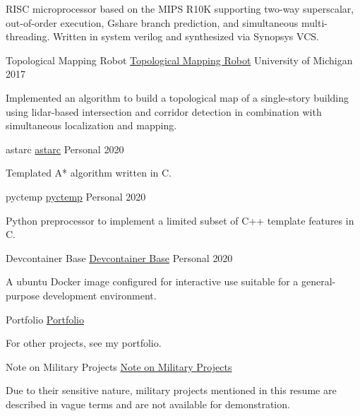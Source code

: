 \documentclass[11pt, a4paper]{cv}
\newenvironment{projects}{}{\par}
\newenvironment{cv}{}{\par}
\begin{document}
\begin{cv}
\begin{projects}
\begin{cventries}
{\begin{cvparagraph}
RISC microprocessor based on the MIPS R10K supporting two-way superscalar, out-of-order execution, Gshare branch prediction, and simultaneous multi-threading. Written in system verilog and synthesized via Synopsys VCS.
\end{cvparagraph}}
\cventrycompact
{
{Topological Mapping Robot}
{\color{hrefblue}\href{https://drive.google.com/drive/folders/1HPq7hU05i7k-j3WwfQ18W5DzQ3FlkSZ9}{Topological Mapping Robot}}}
{}
{University of Michigan}
{2017}
{\begin{cvparagraph}
Implemented an algorithm to build a topological map of a single-story building using lidar-based intersection and corridor detection in combination with simultaneous localization and mapping.
\end{cvparagraph}}
\cventrycompact
{
{astarc}
{\color{hrefblue}\href{https://github.com/brandonmosher/astarc}{astarc}}}
{}
{Personal}
{2020}
{\begin{cvparagraph}
Templated A* algorithm written in C.
\end{cvparagraph}}
\cventrycompact
{
{pyctemp}
{\color{hrefblue}\href{https://github.com/brandonmosher/pyctemp}{pyctemp}}}
{}
{Personal}
{2020}
{\begin{cvparagraph}
Python preprocessor to implement a limited subset of C++ template features in C.
\end{cvparagraph}}
\cventrycompact
{
{Devcontainer Base}
{\color{hrefblue}\href{https://github.com/brandonmosher/devcontainer-base}{Devcontainer Base}}}
{}
{Personal}
{2020}
{\begin{cvparagraph}
A ubuntu Docker image configured for interactive use suitable for a general-purpose development environment.
\end{cvparagraph}}
\cventrycompact
{
{Portfolio}
{\color{hrefblue}\href{https://brandon.mosher.xyz/\#projects}{Portfolio}}}
{}
{}
{}
{\begin{cvparagraph}
For other projects, see my portfolio.
\end{cvparagraph}}
\cventrycompact
{\ifstrempty{}
{Note on Military Projects}
{\color{hrefblue}\href{}{Note on Military Projects}}}
{}
{}
{}
{\begin{cvparagraph}
Due to their sensitive nature, military projects mentioned in this resume are described in vague terms and are not available for demonstration.

\end{cvparagraph}}
\end{cventries}
\end{projects}
\end{cv}
\end{document}
